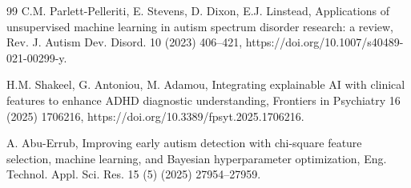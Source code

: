\documentclass[pdflatex,sn-vancouver-num]{sn-jnl}
\begin{document}
\begin{thebibliography}{99}
C.M. Parlett-Pelleriti, E. Stevens, D. Dixon, E.J. Linstead, Applications of unsupervised machine learning in autism spectrum disorder research: a review, Rev. J. Autism Dev. Disord. 10 (2023) 406--421, https://doi.org/10.1007/s40489-021-00299-y.

H.M. Shakeel, G. Antoniou, M. Adamou, Integrating explainable AI with clinical features to enhance ADHD diagnostic understanding, Frontiers in Psychiatry 16 (2025) 1706216, https://doi.org/10.3389/fpsyt.2025.1706216.

A. Abu-Errub, Improving early autism detection with chi-square feature selection, machine learning, and Bayesian hyperparameter optimization, Eng. Technol. Appl. Sci. Res. 15 (5) (2025) 27954--27959.

\end{thebibliography}
\end{document}
